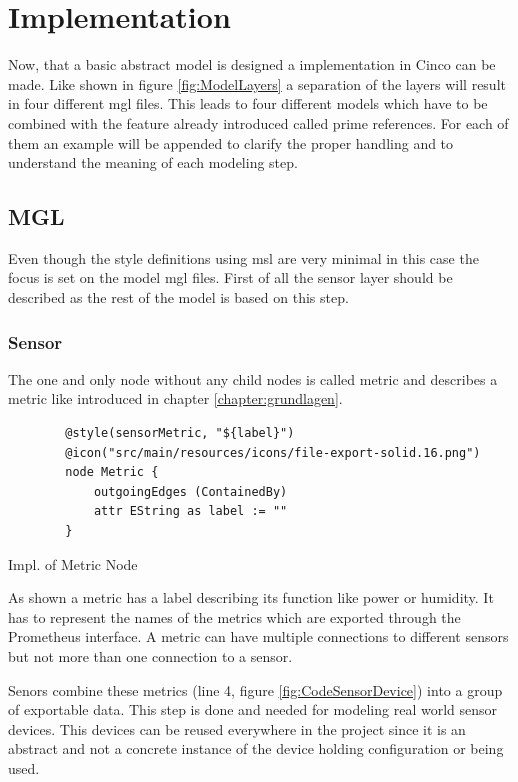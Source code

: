 \chapter{Implementation}
\label{chapter:realisierung}
Now, that a basic abstract model is designed a implementation in Cinco can be made. Like shown in figure \ref{fig:ModelLayers} a separation of the layers will result in four different \gls{mgl} files. This leads to four different models which have to be combined with the feature already introduced called prime references. For each of them an example will be appended to clarify the proper handling and to understand the meaning of each modeling step.
\section{MGL}
Even though the style definitions using \gls{msl} are very minimal in this case the focus is set on the model \gls{mgl} files.
First of all the sensor layer should be described as the rest of the model is based on this step.
\subsection{Sensor}
The one and only node without any child nodes is called metric and describes a metric like introduced in chapter \ref{chapter:grundlagen}. 
\begin{listing}[H]
	\begin{verbatim}
		@style(sensorMetric, "${label}")
		@icon("src/main/resources/icons/file-export-solid.16.png")
		node Metric {
			outgoingEdges (ContainedBy)
			attr EString as label := ""
		}
	\end{verbatim}
	\caption{Impl. of Metric Node}
	\label{lst:nodeMetric}
\end{listing}
As shown a metric has a label describing its function like power or humidity. It has to represent the names of the metrics which are exported through the Prometheus interface. A metric can have multiple connections to different sensors but not more than one connection to a sensor.

Senors combine these metrics (line 4, figure \ref{fig:CodeSensorDevice}) into a group of exportable data. This step is done and needed for modeling real world sensor devices. This devices can be reused everywhere in the project since it is an abstract and not a concrete instance of the device holding configuration or being used. 

